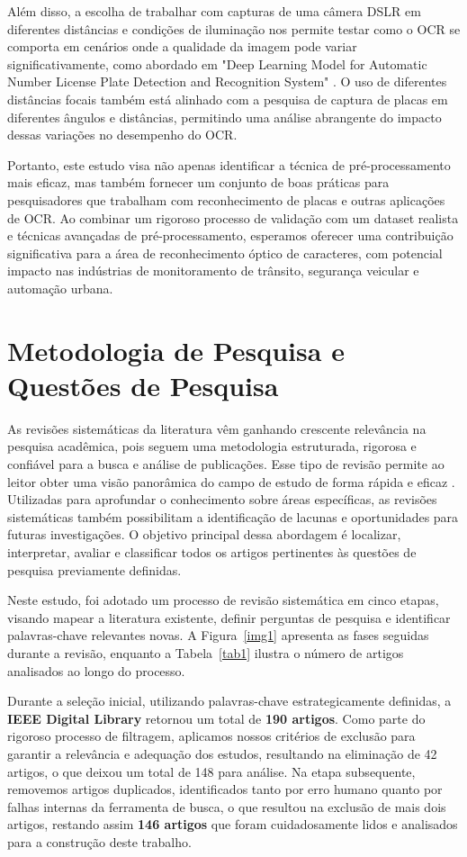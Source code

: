 \documentclass[conference]{IEEEtran}
\begin{document}
Além disso, a escolha de trabalhar com capturas de uma câmera DSLR em diferentes distâncias e condições de iluminação nos permite testar como o OCR se comporta em cenários onde a qualidade da imagem pode variar significativamente, como abordado em "Deep Learning Model for Automatic Number License Plate Detection and Recognition System" \cite{b3}. O uso de diferentes distâncias focais também está alinhado com a pesquisa de captura de placas em diferentes ângulos e distâncias, permitindo uma análise abrangente do impacto dessas variações no desempenho do OCR.

Portanto, este estudo visa não apenas identificar a técnica de pré-processamento mais eficaz, mas também fornecer um conjunto de boas práticas para pesquisadores que trabalham com reconhecimento de placas e outras aplicações de OCR. Ao combinar um rigoroso processo de validação com um dataset realista e técnicas avançadas de pré-processamento, esperamos oferecer uma contribuição significativa para a área de reconhecimento óptico de caracteres, com potencial impacto nas indústrias de monitoramento de trânsito, segurança veicular e automação urbana. 

\section{Metodologia de Pesquisa e Questões de Pesquisa}

As revisões sistemáticas da literatura vêm ganhando crescente relevância na pesquisa acadêmica, pois seguem uma metodologia estruturada, rigorosa e confiável para a busca e análise de publicações. Esse tipo de revisão permite ao leitor obter uma visão panorâmica do campo de estudo de forma rápida e eficaz \cite{b4}. Utilizadas para aprofundar o conhecimento sobre áreas específicas, as revisões sistemáticas também possibilitam a identificação de lacunas e oportunidades para futuras investigações. O objetivo principal dessa abordagem é localizar, interpretar, avaliar e classificar todos os artigos pertinentes às questões de pesquisa previamente definidas.

Neste estudo, foi adotado um processo de revisão sistemática em cinco etapas, visando mapear a literatura existente, definir perguntas de pesquisa e identificar palavras-chave relevantes novas. A Figura~\ref{img1} apresenta as fases seguidas durante a revisão, enquanto a Tabela~\ref{tab1} ilustra o número de artigos analisados ao longo do processo.

Durante a seleção inicial, utilizando palavras-chave estrategicamente definidas, a \textbf{IEEE Digital Library} retornou um total de \textbf{190 artigos}. Como parte do rigoroso processo de filtragem, aplicamos nossos critérios de exclusão para garantir a relevância e adequação dos estudos, resultando na eliminação de 42 artigos, o que deixou um total de 148 para análise. Na etapa subsequente, removemos artigos duplicados, identificados tanto por erro humano quanto por falhas internas da ferramenta de busca, o que resultou na exclusão de mais dois artigos, restando assim \textbf{146 artigos} que foram cuidadosamente lidos e analisados para a construção deste trabalho.
\end{document}
